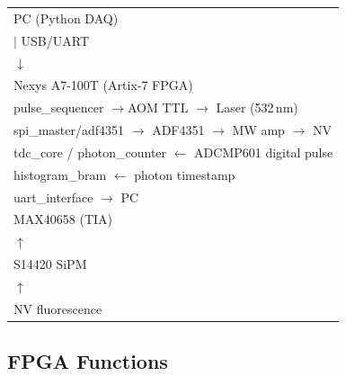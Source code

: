 \begin{center}
\small\ttfamily
\begin{tabular}{l}
PC (Python DAQ)                                           \\
  $\vert$  USB/UART                                        \\
  $\downarrow$                                             \\
Nexys A7-100T (Artix-7 FPGA)                              \\
  \quad pulse\_sequencer \quad$\to$\quad AOM TTL $\to$ Laser (532\,nm) \\
  \quad spi\_master/adf4351 $\to$ ADF4351 $\to$ MW amp $\to$ NV       \\
  \quad tdc\_core / photon\_counter $\leftarrow$ ADCMP601 digital pulse \\
  \quad histogram\_bram \quad$\leftarrow$ photon timestamp              \\
  \quad uart\_interface \quad$\to$ PC                                   \\
  \qquad\qquad\qquad\qquad\qquad MAX40658 (TIA)                        \\
  \qquad\qquad\qquad\qquad\qquad\quad $\uparrow$                       \\
  \qquad\qquad\qquad\qquad\qquad S14420 SiPM                           \\
  \qquad\qquad\qquad\qquad\qquad\quad $\uparrow$                       \\
  \qquad\qquad\qquad\qquad\quad NV fluorescence                        \\
\end{tabular}
\end{center}

\subsection{FPGA Functions}

